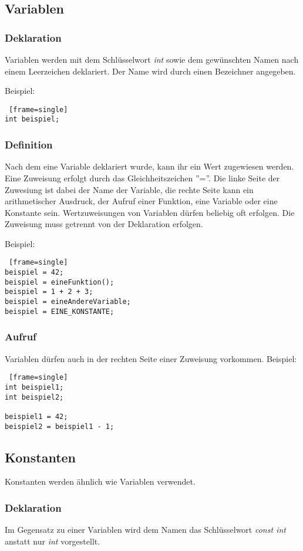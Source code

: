 \subsection{Variablen}
\subsubsection{Deklaration}
Variablen werden mit dem Schlüsselwort \textit{int} sowie dem gewünschten Namen nach einem Leerzeichen deklariert.
Der Name wird durch einen Bezeichner angegeben.

Beispiel:
\begin{lstlisting} [frame=single] 
int beispiel;
\end{lstlisting}

\subsubsection{Definition}
Nach dem eine Variable deklariert wurde, kann ihr ein Wert zugewiesen werden. Eine Zuweisung erfolgt durch das Gleichheitszeichen ''=''. Die linke Seite der Zuwesiung ist dabei der Name der Variable, die rechte Seite  kann ein arithmetischer Ausdruck, der Aufruf einer Funktion, eine Variable oder eine Konstante sein.
Wertzuweisungen von Variablen dürfen beliebig oft erfolgen.
Die Zuweisung muss getrennt von der Deklaration erfolgen.

Beispiel:
\begin{lstlisting} [frame=single] 
beispiel = 42;
beispiel = eineFunktion();
beispiel = 1 + 2 + 3;
beispiel = eineAndereVariable;
beispiel = EINE_KONSTANTE;
\end{lstlisting}

\subsubsection{Aufruf}
Variablen dürfen auch in der rechten Seite einer Zuweisung vorkommen.
Beispiel:
\begin{lstlisting} [frame=single] 
int beispiel1;
int beispiel2;

beispiel1 = 42;
beispiel2 = beispiel1 - 1;
\end{lstlisting}


\subsection{Konstanten}
Konstanten werden ähnlich wie Variablen verwendet.

\subsubsection{Deklaration}
Im Gegensatz zu einer Variablen wird dem Namen das Schlüsselwort \textit{const int} anstatt nur \textit{int} vorgestellt.

